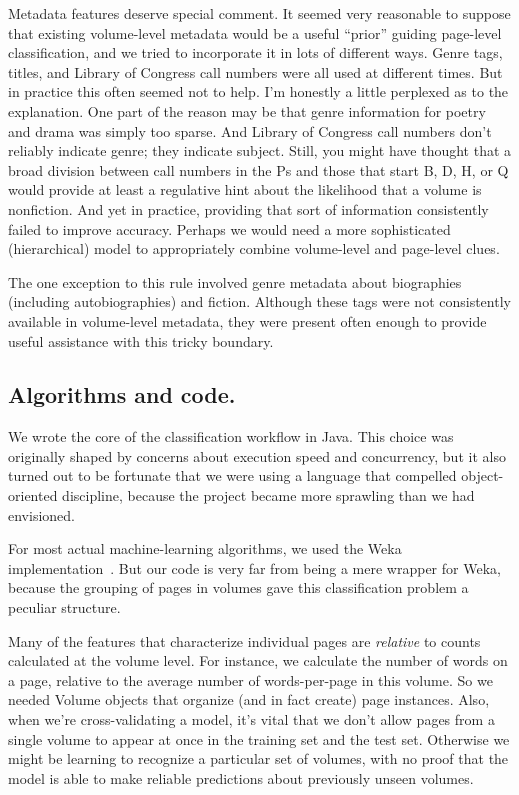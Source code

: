 \documentclass[paper=a4, fontsize=12pt]{scrartcl}
\numberwithin{equation}{section}		%
\numberwithin{figure}{section}			%
\numberwithin{table}{section}				%
\begin{document}
Metadata features deserve special comment. It seemed very reasonable to suppose that existing volume-level metadata would be a useful ``prior'' guiding page-level classification, and we tried to incorporate it in lots of different ways. Genre tags, titles, and Library of Congress call numbers were all used at different times. But in practice this often seemed not to help. I'm honestly a little perplexed as to the explanation. One part of the reason may be that genre information for poetry and drama was simply too sparse. And Library of Congress call numbers don't reliably indicate genre; they indicate subject. Still, you might have thought that a broad division between call numbers in the Ps and those that start B, D, H, or Q would provide at least a regulative hint about the likelihood that a volume is nonfiction. And yet in practice, providing that sort of information consistently failed to improve accuracy. Perhaps we would need a more sophisticated (hierarchical) model to appropriately combine volume-level and page-level clues.

The one exception to this rule involved genre metadata about biographies (including autobiographies) and fiction. Although these tags were not consistently available in volume-level metadata, they were present often enough to provide useful assistance with this tricky boundary.

\subsection{Algorithms and code.}

We wrote the core of the classification workflow in Java. This choice was originally shaped by concerns about execution speed and concurrency, but it also turned out to be fortunate that we were using a language that compelled object-oriented discipline, because the project became more sprawling than we had envisioned. 

For most actual machine-learning algorithms, we used the Weka implementation~\cite{weka}. But our code is very far from being a mere wrapper for Weka, because the grouping of pages in volumes gave this classification problem a peculiar structure. 

Many of the features that characterize individual pages are \textit{relative} to counts calculated at the volume level. For instance, we calculate the number of words on a page, relative to the average number of words-per-page in this volume. So we needed Volume objects that organize (and in fact create) page instances. Also, when we're cross-validating a model, it's vital that we don't allow pages from a single volume to appear at once in the training set and the test set. Otherwise we might be learning to recognize a particular set of volumes, with no proof that the model is able to make reliable predictions about previously unseen volumes.
\end{document}
